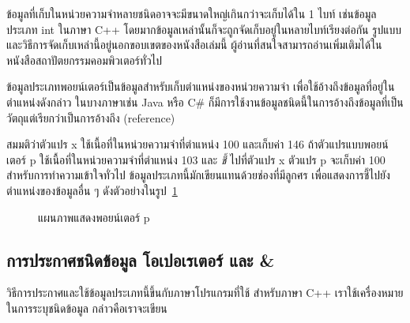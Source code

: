 ข้อมูล{\wbr}ที่{\wbr}เก็บ{\wbr}ใน{\wbr}หน่วย{\wbr}ความ{\wbr}จำ{\wbr}หลาย{\wbr}ชนิด{\wbr}อาจ{\wbr}จะ{\wbr}มี{\wbr}ขนาด{\wbr}ใหญ่{\wbr}เกิน{\wbr}กว่า{\wbr}จะ{\wbr}เก็บ{\wbr}ได้{\wbr}ใน 1 ไบท์
เช่น{\wbr}ข้อมูล{\wbr}ประเภท {\ct int} ใน{\wbr}ภาษา C++
โดย{\wbr}มาก{\wbr}ข้อมูล{\wbr}เหล่า{\wbr}นั้น{\wbr}ก็{\wbr}จะ{\wbr}ถูก{\wbr}จัด{\wbr}เก็บ{\wbr}อยู่{\wbr}ใน{\wbr}หลาย{\wbr}ไบท์{\wbr}เรียง{\wbr}ต่อ{\wbr}กัน{\wbr}
รูปแบบ{\wbr}และ{\wbr}วิธีการ{\wbr}จัด{\wbr}เก็บ{\wbr}เหล่า{\wbr}นี้{\wbr}อยู่{\wbr}นอก{\wbr}ขอบเขต{\wbr}ของ{\wbr}หนังสือ{\wbr}เล่ม{\wbr}นี้{\wbr}
ผู้{\wbr}อ่าน{\wbr}ที่{\wbr}สนใจ{\wbr}สามารถ{\wbr}อ่าน{\wbr}เพิ่มเติม{\wbr}ได้{\wbr}ใน{\wbr}หนังสือ{\wbr}สถาปัตยกรรม{\wbr}คอมพิวเตอร์{\wbr}ทั่วไป{\wbr}

ข้อมูล{\wbr}ประเภท{\wbr}พอยน์เตอร์{\wbr}เป็น{\wbr}ข้อมูล{\wbr}สำหรับ{\wbr}เก็บ{\wbr}ตำแหน่ง{\wbr}ของ{\wbr}หน่วย{\wbr}ความ{\wbr}จำ{\wbr}
เพื่อ{\wbr}ใช้{\wbr}อ้าง{\wbr}ถึง{\wbr}ข้อมูล{\wbr}ที่{\wbr}อยู่{\wbr}ใน{\wbr}ตำแหน่ง{\wbr}ดัง{\wbr}กล่าว ใน{\wbr}บาง{\wbr}ภาษา{\wbr}เช่น Java หรือ C\#
ก็{\wbr}มี{\wbr}การ{\wbr}ใช้งาน{\wbr}ข้อมูล{\wbr}ชนิด{\wbr}นี้{\wbr}ใน{\wbr}การ{\wbr}อ้าง{\wbr}ถึง{\wbr}ข้อมูล{\wbr}ที่{\wbr}เป็น{\wbr}วัตถุ{\wbr}แต่{\wbr}เรียก{\wbr}ว่า{\wbr}เป็น{\wbr}การ{\wbr}อ้าง{\wbr}ถึง (reference)

สมมติ{\wbr}ว่า{\wbr}ตัวแปร {\ct x} ใช้{\wbr}เนื้อที่{\wbr}ใน{\wbr}หน่วย{\wbr}ความ{\wbr}จำ{\wbr}ที่{\wbr}ตำแหน่ง 100 และ{\wbr}เก็บ{\wbr}ค่า 146
ถ้า{\wbr}ตัวแปร{\wbr}แบบ{\wbr}พอยน์เตอร์ {\ct p} ใช้{\wbr}เนื้อที่{\wbr}ใน{\wbr}หน่วย{\wbr}ความ{\wbr}จำ{\wbr}ที่{\wbr}ตำแหน่ง 103 และ {\em ชี้}
ไป{\wbr}ที่{\wbr}ตัวแปร {\ct x} ตัวแปร {\ct p} จะ{\wbr}เก็บ{\wbr}ค่า 100 สำหรับ{\wbr}การ{\wbr}ทำ{\wbr}ความ{\wbr}เข้าใจ{\wbr}ทั่วไป{\wbr}
ข้อมูล{\wbr}ประเภท{\wbr}นี้{\wbr}มัก{\wbr}เขียน{\wbr}แทน{\wbr}ด้วย{\wbr}ช่อง{\wbr}ที่{\wbr}มี{\wbr}ลูกศร เพื่อ{\wbr}แสดง{\wbr}การ{\wbr}ชี้{\wbr}ไป{\wbr}ยัง{\wbr}ตำแหน่ง{\wbr}ของ{\wbr}ข้อมูล{\wbr}อื่น ๆ
ดัง{\wbr}ตัวอย่าง{\wbr}ใน{\wbr}รูป~\ref{fig:array-example-pointer}

\begin{figure}
\begin{center}
\end{center}
\caption{แผนภาพ{\wbr}แสดง{\wbr}พอยน์เตอร์ {\ct p}}
\label{fig:array-example-pointer}
\end{figure}

\subsection{การ{\wbr}ประกาศ{\wbr}ชนิด{\wbr}ข้อมูล โอเปอเรเตอร์ {\ct *} และ {\ct \&}}
วิธีการ{\wbr}ประกาศ{\wbr}และ{\wbr}ใช้{\wbr}ข้อมูล{\wbr}ประเภท{\wbr}นี้{\wbr}ขึ้น{\wbr}กับ{\wbr}ภาษา{\wbr}โปรแกรม{\wbr}ที่{\wbr}ใช้ สำหรับ{\wbr}ภาษา C++
เรา{\wbr}ใช้{\wbr}เครื่องหมาย {\ct *} ใน{\wbr}การ{\wbr}ระบุ{\wbr}ชนิด{\wbr}ข้อมูล กล่าว{\wbr}คือ{\wbr}เรา{\wbr}จะ{\wbr}เขียน{\wbr}

